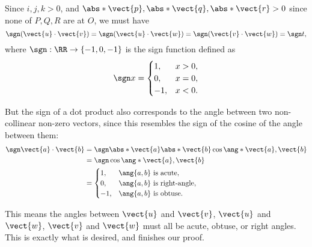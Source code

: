 \begin{enumerate}
          Since \(i, j, k > 0\), and \(\abs*{\vect{p}}, \abs*{\vect{q}}, \abs*{\vect{r}} > 0\) since none of \(P, Q, R\) are at \(O\), we must have
          \[
              \sgn (\vect{u} \cdot \vect{v}) = \sgn (\vect{u} \cdot \vect{w}) = \sgn (\vect{v} \cdot \vect{w}) = \sgn t,
          \]
          where \(\sgn: \RR \to \{-1, 0, -1\}\) is the sign function defined as
          \[
              \sgn x = \begin{cases}
                  1,  & x > 0, \\
                  0,  & x = 0, \\
                  -1, & x < 0.
              \end{cases}
          \]

          But the sign of a dot product also corresponds to the angle between two non-collinear non-zero vectors, since this resembles the sign of the cosine of the angle between them:
          \begin{align*}
              \sgn \vect{a} \cdot \vect{b} & = \sgn \abs*{\vect{a}} \abs*{\vect{b}} \cos \ang*{\vect{a}, \vect{b}} \\
                                           & = \sgn \cos \ang*{\vect{a}, \vect{b}}                                 \\
                                           & = \begin{cases}
                                                   1,  & \ang{a, b} \text{ is acute},       \\
                                                   0,  & \ang{a, b} \text{ is right-angle}, \\
                                                   -1, & \ang{a, b} \text{ is obtuse}.
                                               \end{cases}
          \end{align*}

          This means the angles between \(\vect{u}\) and \(\vect{v}\), \(\vect{u}\) and \(\vect{w}\), \(\vect{v}\) and \(\vect{w}\) must all be acute, obtuse, or right angles. This is exactly what is desired, and finishes our proof.
\end{enumerate}